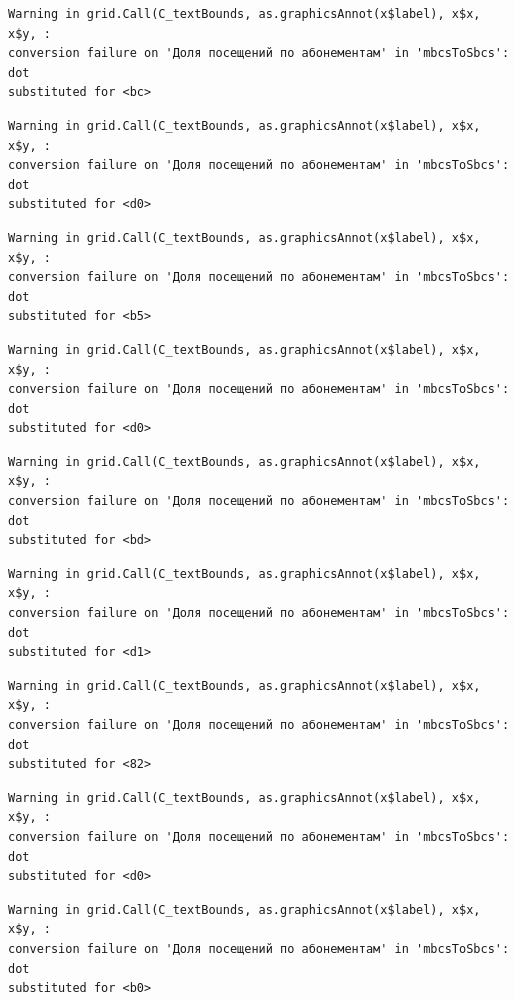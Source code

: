 \documentclass[
  letterpaper,
  DIV=11,
  numbers=noendperiod]{scrartcl}
\begin{document}
\begin{verbatim}
Warning in grid.Call(C_textBounds, as.graphicsAnnot(x$label), x$x, x$y, :
conversion failure on 'Доля посещений по абонементам' in 'mbcsToSbcs': dot
substituted for <bc>
\end{verbatim}

\begin{verbatim}
Warning in grid.Call(C_textBounds, as.graphicsAnnot(x$label), x$x, x$y, :
conversion failure on 'Доля посещений по абонементам' in 'mbcsToSbcs': dot
substituted for <d0>
\end{verbatim}

\begin{verbatim}
Warning in grid.Call(C_textBounds, as.graphicsAnnot(x$label), x$x, x$y, :
conversion failure on 'Доля посещений по абонементам' in 'mbcsToSbcs': dot
substituted for <b5>
\end{verbatim}

\begin{verbatim}
Warning in grid.Call(C_textBounds, as.graphicsAnnot(x$label), x$x, x$y, :
conversion failure on 'Доля посещений по абонементам' in 'mbcsToSbcs': dot
substituted for <d0>
\end{verbatim}

\begin{verbatim}
Warning in grid.Call(C_textBounds, as.graphicsAnnot(x$label), x$x, x$y, :
conversion failure on 'Доля посещений по абонементам' in 'mbcsToSbcs': dot
substituted for <bd>
\end{verbatim}

\begin{verbatim}
Warning in grid.Call(C_textBounds, as.graphicsAnnot(x$label), x$x, x$y, :
conversion failure on 'Доля посещений по абонементам' in 'mbcsToSbcs': dot
substituted for <d1>
\end{verbatim}

\begin{verbatim}
Warning in grid.Call(C_textBounds, as.graphicsAnnot(x$label), x$x, x$y, :
conversion failure on 'Доля посещений по абонементам' in 'mbcsToSbcs': dot
substituted for <82>
\end{verbatim}

\begin{verbatim}
Warning in grid.Call(C_textBounds, as.graphicsAnnot(x$label), x$x, x$y, :
conversion failure on 'Доля посещений по абонементам' in 'mbcsToSbcs': dot
substituted for <d0>
\end{verbatim}

\begin{verbatim}
Warning in grid.Call(C_textBounds, as.graphicsAnnot(x$label), x$x, x$y, :
conversion failure on 'Доля посещений по абонементам' in 'mbcsToSbcs': dot
substituted for <b0>
\end{verbatim}
\end{document}
